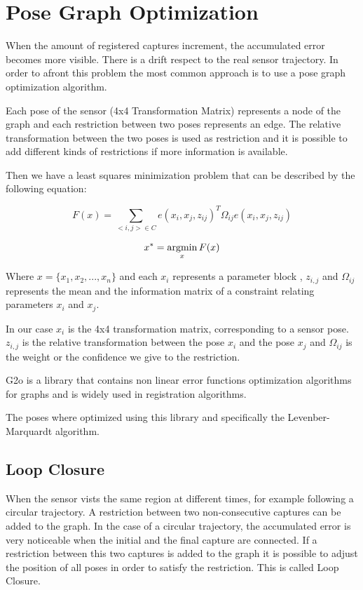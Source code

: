\section{Pose Graph Optimization}

When the amount of registered captures increment, the accumulated error 
becomes more visible. There is a drift respect to the real sensor trajectory. 
In order to afront this problem the most common approach is to use a pose graph 
optimization algorithm. 

Each pose of the sensor (4x4 Transformation Matrix) represents a node of the 
graph and each restriction between two poses represents an edge. The relative 
transformation between the two poses is used as restriction and it is possible 
to add different kinds of restrictions if more information is available.

Then we have a least squares minimization problem that can be described by the following equation:

$$ F(x) = \sum\limits_{<i,j> \in C } e(x_i,x_j,z_{ij})^T \Omega_{ij} e(x_i,x_j,z_{ij}) $$

$$ x^* = \mathop{\rm argmin}_x F(x) $$

Where $x=\{x_1,x_2,...,x_n\}$ and each $x_i$ represents a parameter block , $z_{i,j}$ and $\Omega_{ij}$ represents the mean  
 and the information matrix  of a constraint 
relating parameters $x_i$ and $x_j$.

In our case $x_i$ is the 4x4 transformation matrix, corresponding to a sensor pose. $z_{i,j}$ is the 
relative transformation between the pose $x_i$ and the pose $x_j$ and $\Omega_{ij}$ is the weight or 
the confidence we give to the restriction.



G2o is a library that contains non linear error functions optimization 
algorithms for graphs and is widely used in registration algorithms. 

The poses where optimized using this library and specifically the 
Levenber-Marquardt algorithm.



\subsection{Loop Closure}

When the sensor vists the same region at different times, for example following 
a circular trajectory. A restriction between two non-consecutive captures can be 
added to the graph. In the case of a circular trajectory, the accumulated error 
is very noticeable when the initial and the final capture are connected. If a 
restriction between this two captures is added to the graph it is possible to 
adjust the position of all poses in order to satisfy the restriction. This 
is called Loop Closure.




